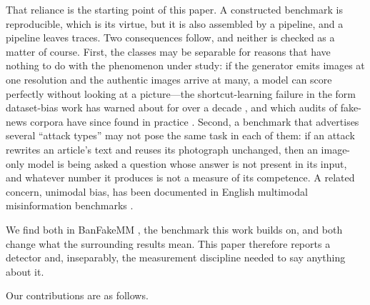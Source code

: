 \documentclass[pdflatex,sn-mathphys-num]{sn-jnl}
\begin{document}
That reliance is the starting point of this paper. A constructed benchmark is
reproducible, which is its virtue, but it is also assembled by a pipeline, and
a pipeline leaves traces. Two consequences follow, and neither is checked as a
matter of course. First, the classes may be separable for reasons that have
nothing to do with the phenomenon under study: if the generator emits images at
one resolution and the authentic images arrive at many, a model can score
perfectly without looking at a picture---the shortcut-learning failure
\cite{shortcut} in the form dataset-bias work has warned about for over a
decade \cite{datasetbias}, and which audits of fake-news corpora have since
found in practice \cite{verma}. Second, a benchmark that advertises several
``attack types'' may not pose the same task in each of them: if an attack
rewrites an article's text and reuses its photograph unchanged, then an
image-only model is being asked a question whose answer is not present in its
input, and whatever number it produces is not a measure of its competence. A
related concern, unimodal bias, has been documented in English multimodal
misinformation benchmarks \cite{verite}.

We find both in BanFakeMM \cite{banfakemm}, the benchmark this work builds on,
and both change what the surrounding results mean. This paper therefore reports
a detector and, inseparably, the measurement discipline needed to say anything
about it.

Our contributions are as follows.
\end{document}

